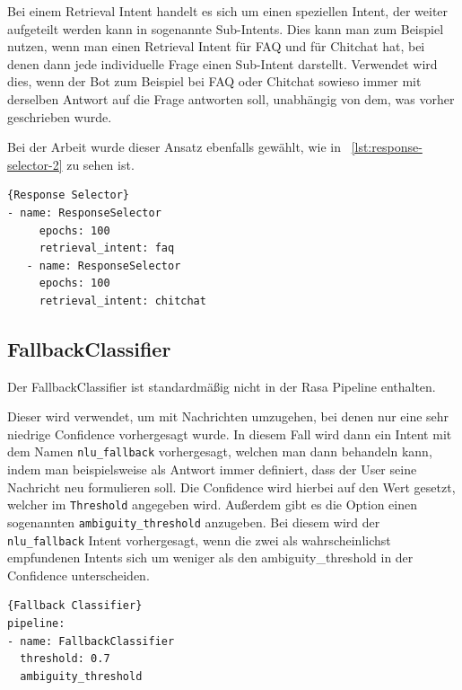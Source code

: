 Bei einem Retrieval Intent handelt es sich um einen speziellen Intent, der weiter aufgeteilt werden kann in sogenannte Sub-Intents.
Dies kann man zum Beispiel nutzen, wenn man einen Retrieval Intent für FAQ und für Chitchat hat, bei denen dann jede individuelle Frage einen Sub-Intent darstellt.\cite{retrievalIntent}
Verwendet wird dies, wenn der Bot zum Beispiel bei FAQ oder Chitchat sowieso immer mit derselben Antwort auf die Frage antworten soll, unabhängig von dem, was vorher geschrieben wurde.\cite{chitchatAndFaqs}

Bei der Arbeit wurde dieser Ansatz ebenfalls gewählt, wie in ~\ref{lst:response-selector-2} zu sehen ist.

\begin{lstlisting}[label={lst:response-selector-2},caption={Response Selector für Chitchat und FAQ}]{Response Selector}
- name: ResponseSelector
     epochs: 100
     retrieval_intent: faq
   - name: ResponseSelector
     epochs: 100
     retrieval_intent: chitchat
\end{lstlisting}

\subsection{FallbackClassifier}\label{subsec:fallback-classifier}

Der FallbackClassifier ist standardmäßig nicht in der Rasa Pipeline enthalten.\cite{startingPipelines}

Dieser wird verwendet, um mit Nachrichten umzugehen, bei denen nur eine sehr niedrige Confidence vorhergesagt wurde.
In diesem Fall wird dann ein Intent mit dem Namen \texttt{nlu\_fallback} vorhergesagt, welchen man dann behandeln kann, indem man beispielsweise als Antwort immer definiert, dass der User seine Nachricht neu formulieren soll.
Die Confidence wird hierbei auf den Wert gesetzt, welcher im \texttt{Threshold} angegeben wird.\cite{fallbackClassifier, nluFallback}
Außerdem gibt es die Option einen sogenannten \texttt{ambiguity\_threshold} anzugeben.
Bei diesem wird der \texttt{nlu\_fallback} Intent vorhergesagt, wenn die zwei als wahrscheinlichst empfundenen Intents sich um weniger als den ambiguity\_threshold in der Confidence unterscheiden.\cite{fallbackClassifier}

\begin{lstlisting}[label={lst:fallback-classifier},caption={Fallback Classifier}]{Fallback Classifier}
pipeline:
- name: FallbackClassifier
  threshold: 0.7
  ambiguity_threshold
\end{lstlisting}


